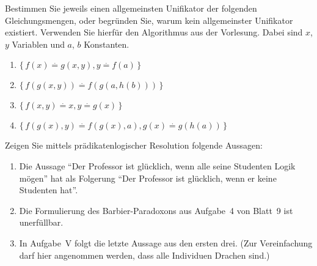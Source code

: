 \documentclass[german]{latteachCD}[2017/03/28]
\begin{document}
\newpage

\setcounter{exercise}{0}


\def\deq{\stackrel{\cdot}{=}}

\begin{exercise}
  Bestimmen Sie jeweils einen allgemeinsten Unifikator der folgenden
  Gleichungsmengen, oder begründen Sie, warum kein allgemeinster Unifikator
  existiert.  Verwenden Sie hierfür den Algorithmus aus der Vorlesung.  Dabei
  sind $x$, $y$ Variablen und $a$, $b$ Konstanten.
  \begin{enumerate}
  \item $\{\,f(x) \deq g(x,y), y \deq f(a)\,\}$
  \item $\{\,f(g(x,y)) \deq f(g(a,h(b)))\,\}$
  \item $\{\,f(x,y) \deq x, y \deq g(x)\,\}$
  \item $\{\,f(g(x),y) \deq f(g(x),a), g(x) \deq g(h(a))\,\}$
  \end{enumerate}
\end{exercise}


\begin{exercise}
  Zeigen Sie mittels prädikatenlogischer Resolution folgende Aussagen:
  \begin{enumerate}
  \item Die Aussage \enquote{Der Professor ist glücklich, wenn alle seine
      Studenten Logik mögen} hat als Folgerung \enquote{Der Professor ist
      glücklich, wenn er keine Studenten hat}.
  \item Die Formulierung des Barbier-Paradoxons aus Aufgabe~4 von Blatt~9 ist
    unerfüllbar.
  \item In Aufgabe~V folgt die letzte Aussage aus den ersten drei.  (Zur
    Vereinfachung darf hier angenommen werden, dass alle Individuen Drachen
    sind.)
  \end{enumerate}
\end{exercise}
\end{document}
